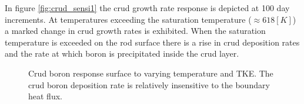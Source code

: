 In figure \ref{fig:crud_sensi1} the crud growth rate response is depicted at 100 day increments.  At temperatures exceeding the saturation temperature ($\approx 618[K]$) a marked change in crud growth rates is exhibited.  When the saturation temperature is exceeded on the rod surface there is a rise in crud deposition rates and the rate at which boron is precipitated inside the crud layer.

\begin{figure}[H]%
    \captionsetup[subfigure]{justification=centering}
    \centering
    \hspace*{-1.0em}%
    \caption[Crud boron response to varying temperature and TKE.]{Crud boron response surface to varying temperature and TKE. The crud boron deposition rate is relatively insensitive to the boundary heat flux.}%
    \label{fig:crud_sensi2}%
\end{figure}

